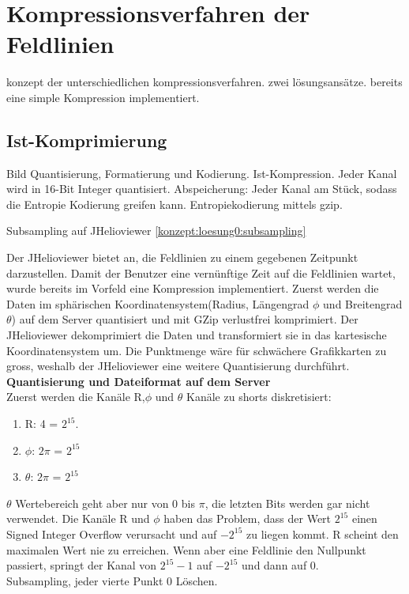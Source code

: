\section{Kompressionsverfahren der Feldlinien} \label{konzept}
konzept der unterschiedlichen kompressionsverfahren. zwei lösungsansätze. 
bereits eine simple Kompression implementiert.

\subsection{Ist-Komprimierung} \label{konzept:ist-komprimierung}
Bild
Quantisierung, Formatierung und Kodierung. 
Ist-Kompression. Jeder Kanal wird in 16-Bit Integer quantisiert.
Abspeicherung: Jeder Kanal am Stück, sodass die Entropie Kodierung greifen kann. Entropiekodierung mittels gzip.

Subsampling auf JHelioviewer \ref{konzept:loesung0:subsampling}

Der JHelioviewer bietet an, die Feldlinien zu einem gegebenen Zeitpunkt darzustellen. Damit der Benutzer eine vernünftige Zeit auf die Feldlinien wartet, wurde bereits im Vorfeld eine Kompression implementiert. Zuerst werden die Daten im sphärischen Koordinatensystem(Radius, Längengrad $\phi$ und Breitengrad $\theta$) auf dem Server quantisiert und mit GZip verlustfrei komprimiert. Der JHelioviewer dekomprimiert die Daten und transformiert sie in das kartesische Koordinatensystem um. Die Punktmenge wäre für schwächere Grafikkarten zu gross, weshalb der JHelioviewer eine weitere Quantisierung durchführt.\\

\textbf{Quantisierung und Dateiformat auf dem Server}\\
Zuerst werden die Kanäle R,$\phi$ und $\theta$ Kanäle zu shorts diskretisiert:
\begin{enumerate}
 \item R: 4 = $2^{15}$. 
 \item $\phi$: $2\pi$ = $2^{15}$
 \item $\theta$: $2\pi$ = $2^{15}$
\end{enumerate}
$\theta$ Wertebereich geht aber nur von 0 bis $\pi$, die letzten Bits werden gar nicht verwendet. Die Kanäle R und $\phi$ haben das Problem, dass der Wert $2^{15}$ einen Signed Integer Overflow verursacht und auf $-2^{15}$ zu liegen kommt. R scheint den maximalen Wert nie zu erreichen. Wenn aber eine Feldlinie den Nullpunkt passiert, springt der Kanal von  $2^{15}-1$ auf $-2^{15}$ und dann auf 0.\\
[\baselineskip]
Subsampling, jeder vierte Punkt 
0 Löschen.

